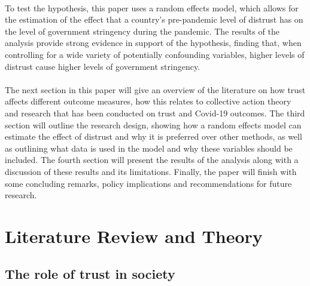 \documentclass[
  11pt,
]{article}
\begin{document}
~\\
To test the hypothesis, this paper uses a random effects model, which allows for the estimation of the effect that a country's pre-pandemic level of distrust has on the level of government stringency during the pandemic. The results of the analysis provide strong evidence in support of the hypothesis, finding that, when controlling for a wide variety of potentially confounding variables, higher levels of distrust cause higher levels of government stringency.\\
~\\
The next section in this paper will give an overview of the literature on how trust affects different outcome measures, how this relates to collective action theory and research that has been conducted on trust and Covid-19 outcomes. The third section will outline the research design, showing how a random effects model can estimate the effect of distrust and why it is preferred over other methods, as well as outlining what data is used in the model and why these variables should be included. The fourth section will present the results of the analysis along with a discussion of these results and its limitations. Finally, the paper will finish with some concluding remarks, policy implications and recommendations for future research.\\

\hfill\break

\hypertarget{literature-review-and-theory}{%
\section{Literature Review and Theory}\label{literature-review-and-theory}}

\hypertarget{the-role-of-trust-in-society}{%
\subsection{The role of trust in society}\label{the-role-of-trust-in-society}}
\end{document}
